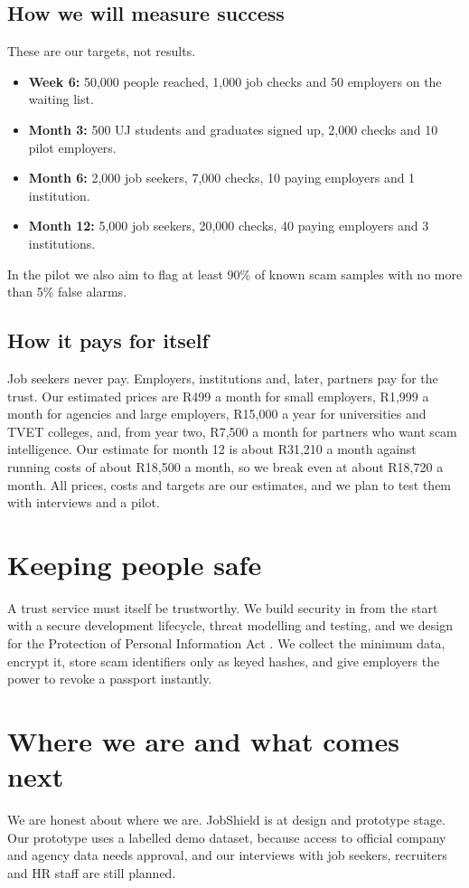 \documentclass[11pt,a4paper]{article}
\begin{document}
\subsection{How we will measure success}
These are our targets, not results.
\begin{itemize}
  \item \textbf{Week 6:} 50,000 people reached, 1,000 job checks and 50 employers on the waiting list.
  \item \textbf{Month 3:} 500 UJ students and graduates signed up, 2,000 checks and 10 pilot employers.
  \item \textbf{Month 6:} 2,000 job seekers, 7,000 checks, 10 paying employers and 1 institution.
  \item \textbf{Month 12:} 5,000 job seekers, 20,000 checks, 40 paying employers and 3 institutions.
\end{itemize}
In the pilot we also aim to flag at least 90\% of known scam samples with no more than 5\% false alarms.

\subsection{How it pays for itself}
Job seekers never pay. Employers, institutions and, later, partners pay for the trust. Our estimated prices are R499 a month for small employers, R1,999 a month for agencies and large employers, R15,000 a year for universities and TVET colleges, and, from year two, R7,500 a month for partners who want scam intelligence. Our estimate for month 12 is about R31,210 a month against running costs of about R18,500 a month, so we break even at about R18,720 a month. All prices, costs and targets are our estimates, and we plan to test them with interviews and a pilot.

\section{Keeping people safe}
A trust service must itself be trustworthy. We build security in from the start with a secure development lifecycle, threat modelling and testing, and we design for the Protection of Personal Information Act \cite{popia}. We collect the minimum data, encrypt it, store scam identifiers only as keyed hashes, and give employers the power to revoke a passport instantly.

\section{Where we are and what comes next}
We are honest about where we are. JobShield is at design and prototype stage. Our prototype uses a labelled demo dataset, because access to official company and agency data needs approval, and our interviews with job seekers, recruiters and HR staff are still planned.
\end{document}
